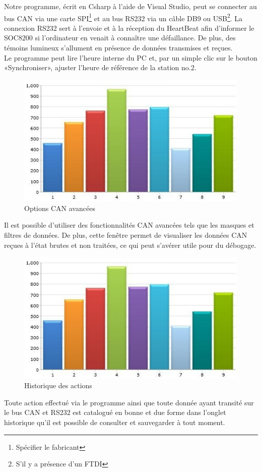 \documentclass[10pt,a4paper,final]{article}
\begin{document}
\begin{spacing}{1.5}
Notre programme, écrit en Csharp à l'aide de Visual Studio, peut se connecter au bus CAN via une carte SPI\footnote{Spécifier le fabricant} et au bus RS232 via un câble DB9 ou USB\footnote{S'il y a présence d'un FTDI}. La connexion RS232 sert à l'envoie et à la réception du HeartBeat afin d'informer le SOC8200 si l'ordinateur en venait à connaître une défaillance. De plus, des témoins lumineux s'allument en présence de données transmises et reçues. \\
Le programme peut lire l'heure interne du PC et, par un simple clic sur le bouton «Synchroniser», ajuster l'heure de référence de la station no.2.\\

\begin{figure}[hbtp]
\caption{Options CAN avancées}
\centering
\includegraphics[scale=0.7]{Images/Bolid.jpg}
\end{figure}
Il est possible d'utiliser des fonctionnalités CAN avancées tels que les masques et filtres de données. De plus, cette fenêtre permet de visualiser les données CAN reçues à l'état brutes et non traitées, ce qui peut s'avérer utile pour du débogage.



\begin{figure}[hbtp]
\caption{Historique des actions}
\centering
\includegraphics[scale=0.7]{Images/Bolid.jpg}
\end{figure}
Toute action effectué via le programme ainsi que toute donnée ayant transité sur le bus CAN et RS232 est catalogué en bonne et due forme dans l'onglet historique qu'il est possible de consulter et sauvegarder à tout moment.




\end{spacing}
\end{document}
